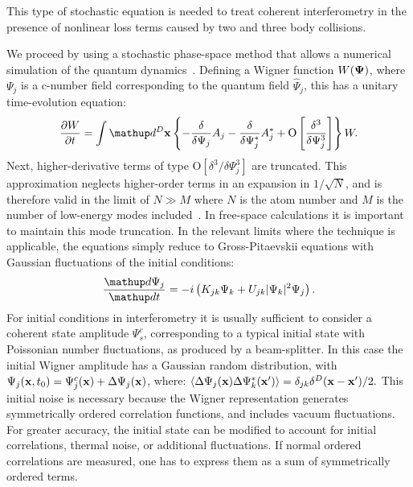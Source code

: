 This type of stochastic equation is needed to treat coherent  interferometry in the presence of nonlinear loss terms caused by two and three body collisions.







We proceed by using a stochastic phase-space method that allows a numerical
simulation of the quantum dynamics~\cite{Drummond1993,Steel1998,Hoffmann2008}.
Defining a Wigner function $W(\mathbf{\Psi})$, where $\Psi_j$
is a c-number field corresponding to the quantum field $\hat{\Psi}_j$, this has a unitary time-evolution equation:
\begin{equation}
    \frac{\partial W}{\partial t} = \int \upd^D\xvec \left\{
        - \frac{\delta}{\delta\Psi_j} A_j
        - \frac{\delta}{\delta\Psi_j^*}A_j^*
        + \mbox{O} \left[ \frac{\delta^3}{\delta\Psi_j^3} \right]
    \right\} W.
\end{equation}
Next, higher-derivative terms of type $\mbox{O} \left[ \delta^3 / \delta\Psi_j^3 \right]$ are truncated.
This approximation neglects higher-order terms in an expansion in $1 / \sqrt{N}$,
and is therefore valid in the limit of $N \gg M$
where $N$ is the atom number and $M$ is the number of low-energy modes included~\cite{Drummond1993,Sinatra2002,Norrie2006}.
In free-space calculations it is important to maintain this mode truncation.
In the relevant limits where the technique is applicable, the equations
simply reduce to Gross-Pitaevskii equations with Gaussian fluctuations
of the initial conditions:
\begin{equation}
\label{eqn:SDE-1}
    \frac{\upd\Psi_j}{\upd t} = -i \left(
        K_{jk} \Psi_k + U_{jk} \lvert \Psi_k \rvert^2 \Psi_j
    \right).
\end{equation}
For initial conditions in interferometry it is usually sufficient to consider
a coherent state amplitude $\Psi_s^c$,
corresponding to a typical initial state with Poissonian number fluctuations,
as produced by a beam-splitter.
In this case the initial Wigner amplitude has a Gaussian random distribution, with
$\Psi_j(\mathbf{x}, t_0) = \Psi_j^c(\mathbf{x}) + \Delta \Psi_j(\mathbf{x})$, where:
$\left\langle \Delta \Psi_j(\mathbf{x}) \Delta \Psi_k^*(\mathbf{x}^{\prime}) \right\rangle =
\delta_{jk} \delta^D(\mathbf{x} - \mathbf{x}^{\prime}) / 2.$
This initial noise is necessary because the Wigner representation generates
symmetrically ordered correlation functions, and includes vacuum fluctuations.
For greater accuracy, the initial state can be modified to account for
initial  correlations, thermal noise, or additional fluctuations.
If normal ordered correlations are measured, one has to express them
as a sum of symmetrically ordered terms.

